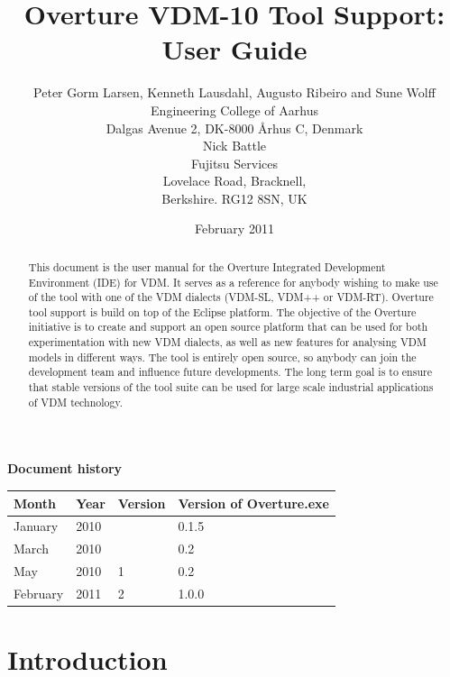 \documentclass{overturerepchap}
\begin{document}
\title{Overture VDM-10 Tool Support: User Guide}
\author{Peter Gorm Larsen, Kenneth Lausdahl, Augusto Ribeiro and Sune Wolff \\ 
Engineering College of Aarhus\\
Dalgas Avenue 2, DK-8000 \AA{}rhus C, Denmark\\[3mm]
Nick Battle\\
Fujitsu Services\\
Lovelace Road, Bracknell, \\
Berkshire. RG12 8SN, UK}

\date{February 2011}


\maketitle


\textbf{Document history}

\begin{tabular}{|l|l|l|l|}\hline
Month   & Year & Version & Version of Overture.exe \\ \hline
January & 2010 &         & 0.1.5 \\ \hline
March   & 2010 &         & 0.2   \\ \hline
May     & 2010 & 1       & 0.2   \\ \hline
February& 2011 & 2       & 1.0.0   \\ \hline
\end{tabular}

\tableofcontents

\begin{abstract}
This document is the user manual for the Overture Integrated Development
Environment (IDE) for
VDM. It serves as a reference for anybody wishing to make use of
the tool with one of the VDM dialects (VDM-SL, VDM++ or VDM-RT).
Overture tool support is build on top of the Eclipse platform. The
objective of the Overture initiative is to create and support an open source
platform that can be used for both experimentation with new VDM dialects,
as well as new features for analysing VDM
models in different ways. The tool is entirely open source, so anybody
can join the development team and influence future
developments. The long term goal is to ensure that stable
versions of the tool suite can be used for large scale industrial
applications of VDM technology.
\end{abstract}

\chapter{Introduction}
\end{document}
